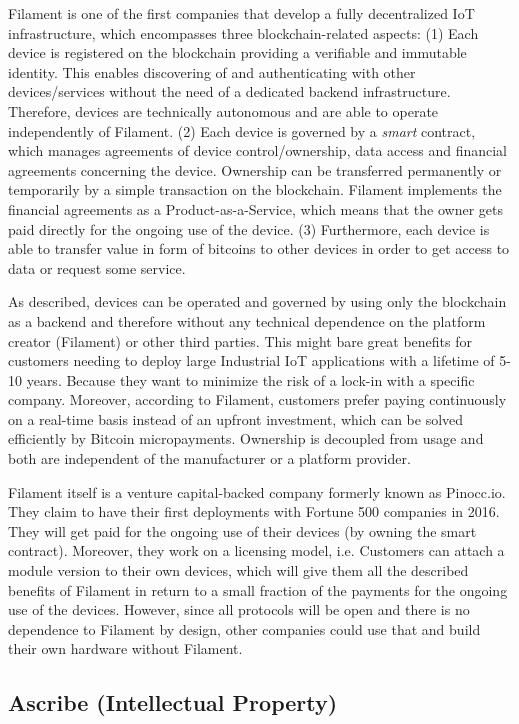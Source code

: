 Filament is one of the first companies that develop a fully decentralized IoT infrastructure, 
which encompasses three blockchain-related aspects: (1) Each device is registered 
on the blockchain providing a verifiable and immutable identity. This enables discovering 
of and authenticating with other devices/services without the need of a dedicated 
backend infrastructure. Therefore, devices are technically autonomous and are able 
to operate independently of Filament. (2) Each device is governed by a \emph{smart} 
contract, which manages agreements of device control/ownership, data access and 
financial agreements concerning the device. Ownership can be transferred permanently 
or temporarily by a simple transaction on the blockchain. Filament implements the 
financial agreements as a Product-as-a-Service, which means that the owner gets 
paid directly for the ongoing use of the device. (3) Furthermore, each device is 
able to transfer value in form of bitcoins to other devices in order to get access 
to data or request some service.

As described, devices can be operated and governed by using only the blockchain 
as a backend and therefore without any technical dependence on the platform creator 
(Filament) or other third parties. This might bare great benefits for customers 
needing to deploy large Industrial IoT applications with a lifetime of 5-10 years. 
Because they want to minimize the risk of a lock-in with a specific company. Moreover, 
according to Filament, customers prefer paying continuously on a real-time basis 
instead of an upfront investment, which can be solved efficiently by Bitcoin micropayments. 
Ownership is decoupled from usage and both are independent of the manufacturer 
or a platform provider.

Filament itself is a venture capital-backed company formerly known as Pinocc.io. 
They claim to have their first deployments with Fortune 500 companies in 2016. 
They will get paid for the ongoing use of their devices (by owning the smart contract). 
Moreover, they work on a licensing model, i.e. Customers can attach a module version 
to their own devices, which will give them all the described benefits of Filament 
in return to a small fraction of the payments for the ongoing use of the devices. 
However, since all protocols will be open and there is no dependence to Filament 
by design, other companies could use that and build their own hardware without 
Filament.

\subsection{Ascribe (Intellectual Property)}
\label{sec:ecoascribe}

